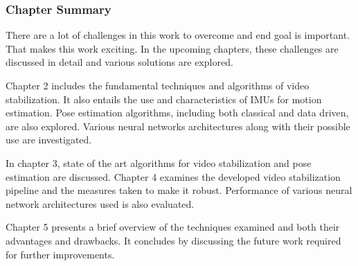 \subsubsection{Chapter Summary}
There are a lot of challenges in this work to overcome and end goal is important. That makes this work exciting. In the upcoming chapters, these challenges are discussed in detail and various solutions are explored. 

Chapter 2 includes the fundamental techniques and algorithms of video stabilization. It also entails the use and characteristics of IMUs for motion estimation. Pose estimation algorithms, including both classical and data driven, are also explored. Various neural networks architectures along with their possible use are investigated.

In chapter 3, state of the art algorithms for video stabilization and pose estimation are discussed. Chapter 4 examines the developed video stabilization pipeline and the measures taken to make it robust. Performance of various neural network architectures used is also evaluated.

Chapter 5 presents a brief overview of the techniques examined and both their advantages and drawbacks. It concludes by discussing the future work required for further improvements.